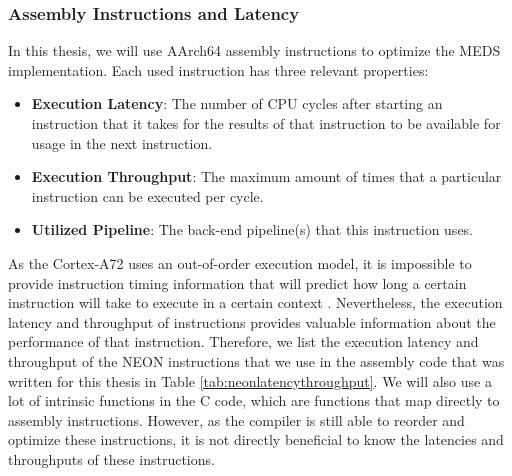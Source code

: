 \documentclass[11pt,a4paper]{report}
\theoremstyle{definition}
\begin{document}
\subsubsection{Assembly Instructions and Latency}
In this thesis, we will use AArch64 assembly instructions to optimize the MEDS implementation. Each used instruction has three relevant properties:
\begin{itemize}
  \item \textbf{Execution Latency}: The number of CPU cycles after starting an instruction that it takes for the results of that instruction to be available for usage in the next instruction.
  \item \textbf{Execution Throughput}: The maximum amount of times that a particular instruction can be executed per cycle.
  \item \textbf{Utilized Pipeline}: The back-end pipeline(s) that this instruction uses.
\end{itemize}

As the Cortex-A72 uses an out-of-order execution model, it is impossible to provide instruction timing information that will predict how long a certain instruction will take to execute in a certain context \cite{CortexA72OptGuide}. Nevertheless, the execution latency and throughput of instructions provides valuable information about the performance of that instruction. Therefore, we list the execution latency and throughput of the NEON instructions that we use in the assembly code that was written for this thesis in Table \ref{tab:neonlatencythroughput}. We will also use a lot of intrinsic functions in the C code, which are functions that map directly to assembly instructions. However, as the compiler is still able to reorder and optimize these instructions, it is not directly beneficial to know the latencies and throughputs of these instructions.
\end{document}
